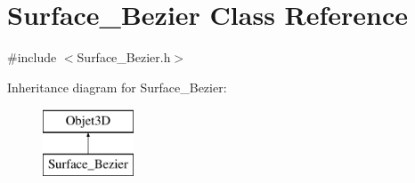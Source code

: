 \hypertarget{classSurface__Bezier}{\section{Surface\-\_\-\-Bezier Class Reference}
\label{classSurface__Bezier}
}


{\ttfamily \#include $<$Surface\-\_\-\-Bezier.\-h$>$}

Inheritance diagram for Surface\-\_\-\-Bezier\-:\begin{figure}[H]
\begin{center}
\leavevmode
\includegraphics[height=2.000000cm]{classSurface__Bezier}
\end{center}
\end{figure}
